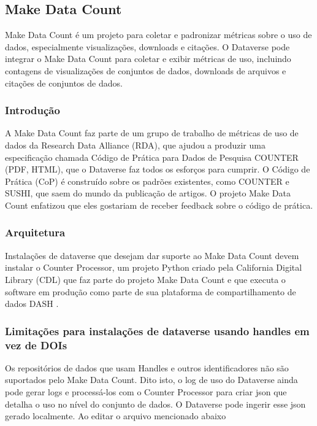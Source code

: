 \documentclass[12pt,hidelinks]{article}
\begin{document}
\subsection{Make Data Count}

\qquad Make Data Count é um projeto para coletar e padronizar métricas sobre o uso de dados, especialmente visualizações, downloads e citações. O Dataverse pode integrar o Make Data Count para coletar e exibir métricas de uso, incluindo contagens de visualizações de conjuntos de dados, downloads de arquivos e citações de conjuntos de dados.

\subsubsection{Introdução}

\qquad A Make Data Count faz parte de um grupo de trabalho de métricas de uso de dados da Research Data Alliance (RDA), que ajudou a produzir uma especificação chamada Código de Prática para Dados de Pesquisa COUNTER (PDF, HTML), que o Dataverse faz todos os esforços para cumprir. O Código de Prática (CoP) é construído sobre os padrões existentes, como COUNTER e SUSHI, que saem do mundo da publicação de artigos. O projeto Make Data Count enfatizou que eles gostariam de receber feedback sobre o código de prática.

\subsubsection{Arquitetura}

\qquad Instalações de dataverse que desejam dar  suporte ao Make Data Count devem instalar o Counter Processor, um projeto Python criado pela California Digital Library (CDL) que faz parte do projeto Make Data Count e que executa o software em produção como parte de sua plataforma de compartilhamento de dados DASH .

\subsubsection{Limitações para instalações de dataverse usando handles em vez de DOIs}

\qquad Os repositórios de dados que usam Handles e outros identificadores não são suportados pelo Make Data Count. Dito isto, o log de uso do Dataverse ainda pode gerar logs e processá-los com o Counter Processor para criar json que detalha o uso no nível do conjunto de dados. O Dataverse pode ingerir esse json gerado localmente. Ao editar o arquivo mencionado abaixo
\end{document}
